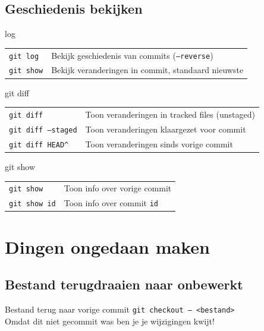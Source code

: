 \subsection{Geschiedenis bekijken}
\begin{frame}{log}
	\begin{tabular}{ll}
		\texttt{git log}& Bekijk geschiedenis van commits (\texttt{--reverse})\\
		\texttt{git show}& Bekijk veranderingen in commit, standaard nieuwste
	\end{tabular}
\end{frame}

\begin{frame}{git diff}
	\begin{tabular}{ll}
		\texttt{git diff}&Toon veranderingen in tracked files (unstaged)\\
		\texttt{git diff --staged}&Toon veranderingen klaargezet voor commit\\
		\texttt{git diff HEAD\^}&Toon veranderingen sinds vorige commit
	\end{tabular}
\end{frame}

\begin{frame}{git show}
	\begin{tabular}{l l}
		\texttt{git show}&Toon info over vorige commit\\
		\texttt{git show id}&Toon info over commit \texttt{id}\\
	\end{tabular}
\end{frame}

\section{Dingen ongedaan maken}

\subsection{Bestand terugdraaien naar onbewerkt}
\begin{frame}{Bestand terug naar vorige commit}
	\texttt{git checkout -- <bestand>} \\
	\alert{Omdat dit niet gecommit was ben je je wijzigingen kwijt!}
\end{frame}

